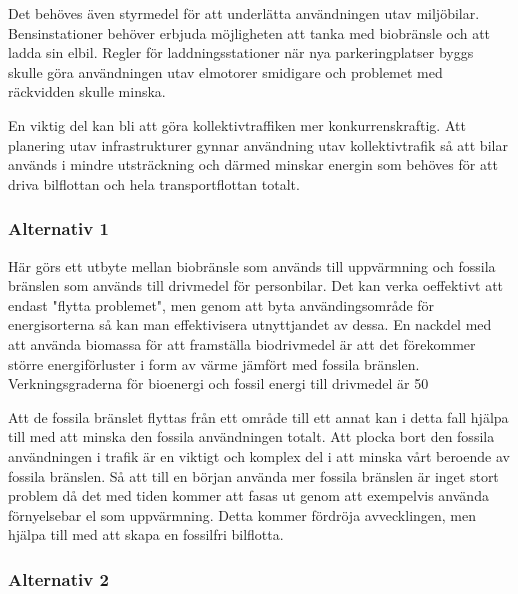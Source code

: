 \documentclass[a4paper,11pt,fleqn, titlepage]{article}
\begin{document}
Det behöves även styrmedel för att underlätta användningen utav miljöbilar. Bensinstationer behöver erbjuda möjligheten att tanka med biobränsle och att ladda sin elbil. Regler för laddningsstationer när nya parkeringplatser byggs skulle göra användningen utav elmotorer smidigare och problemet med räckvidden skulle minska.

En viktig del kan bli att göra kollektivtraffiken mer konkurrenskraftig. Att planering utav infrastrukturer gynnar användning utav kollektivtrafik så att bilar används i mindre utsträckning och därmed minskar energin som behöves för att driva bilflottan och hela transportflottan totalt.

\subsubsection{Alternativ 1}
Här görs ett utbyte mellan biobränsle som används till uppvärmning och fossila bränslen som används till drivmedel för personbilar. Det kan verka oeffektivt att endast "flytta problemet", men genom att byta användingsområde för energisorterna så kan man effektivisera utnyttjandet av dessa. En nackdel med att använda biomassa för att framställa biodrivmedel är att det förekommer större energiförluster i form av värme jämfört med fossila bränslen. Verkningsgraderna för bioenergi och fossil energi till drivmedel är 50%

Att de fossila bränslet flyttas från ett område till ett annat kan i detta fall hjälpa till med att minska den fossila användningen totalt. Att plocka bort den fossila användningen i trafik är en viktigt och komplex del i att minska vårt beroende av fossila bränslen. Så att till en början använda mer fossila bränslen är inget stort problem då det med tiden kommer att fasas ut genom att exempelvis använda förnyelsebar el som uppvärmning. Detta kommer fördröja avvecklingen, men hjälpa till med att skapa en fossilfri bilflotta.

\subsubsection{Alternativ 2}
\end{document}
